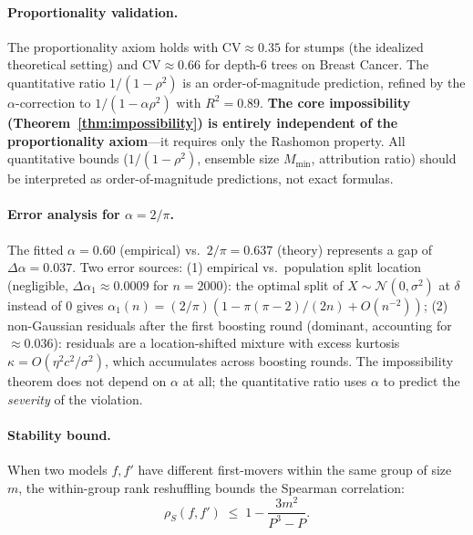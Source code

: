 \documentclass{article}
\begin{document}
\paragraph{Proportionality validation.}
The proportionality axiom holds with CV${\approx}0.35$ for stumps (the idealized theoretical setting) and CV${\approx}0.66$ for depth-6 trees on Breast Cancer. The quantitative ratio $1/(1{-}\rho^2)$ is an order-of-magnitude prediction, refined by the $\alpha$-correction to $1/(1{-}\alpha\rho^2)$ with $R^2 = 0.89$. \textbf{The core impossibility (Theorem~\ref{thm:impossibility}) is entirely independent of the proportionality axiom}---it requires only the Rashomon property. All quantitative bounds ($1/(1{-}\rho^2)$, ensemble size $M_{\min}$, attribution ratio) should be interpreted as order-of-magnitude predictions, not exact formulas.

\paragraph{Error analysis for $\alpha = 2/\pi$.}
The fitted $\alpha = 0.60$ (empirical) vs.\ $2/\pi = 0.637$ (theory) represents a gap of $\Delta\alpha = 0.037$. Two error sources: (1) empirical vs.\ population split location (negligible, $\Delta\alpha_1 \approx 0.0009$ for $n = 2000$): the optimal split of $X \sim \mathcal{N}(0, \sigma^2)$ at $\delta$ instead of $0$ gives $\alpha_1(n) = (2/\pi)(1 - \pi(\pi-2)/(2n) + O(n^{-2}))$; (2) non-Gaussian residuals after the first boosting round (dominant, accounting for $\approx 0.036$): residuals are a location-shifted mixture with excess kurtosis $\kappa = O(\eta^2 c^2/\sigma^2)$, which accumulates across boosting rounds. The impossibility theorem does not depend on $\alpha$ at all; the quantitative ratio uses $\alpha$ to predict the \emph{severity} of the violation.

\paragraph{Stability bound.}
When two models $f, f'$ have different first-movers within the same group of size $m$, the within-group rank reshuffling bounds the Spearman correlation:
\[
    \rho_S(f, f') \;\leq\; 1 - \frac{3m^2}{P^3 - P}.
\]
\end{document}
